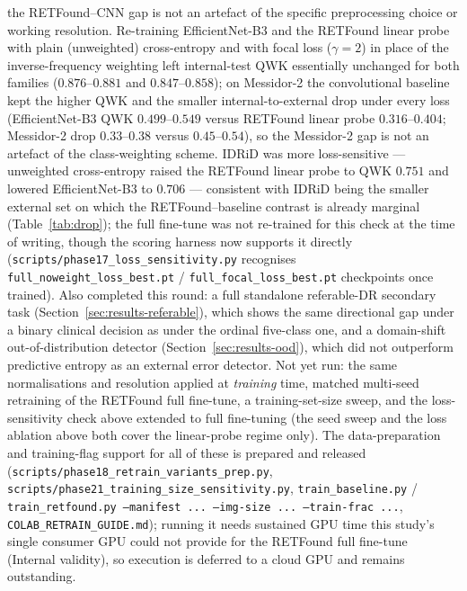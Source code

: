 \documentclass[journal]{IEEEtran}
\begin{document}
the RETFound--CNN gap is not an artefact of the specific preprocessing choice or
working resolution. Re-training EfficientNet-B3 and the RETFound linear probe
with plain (unweighted) cross-entropy and with focal loss ($\gamma=2$) in place
of the inverse-frequency weighting left internal-test QWK essentially unchanged
for both families ($0.876$--$0.881$ and $0.847$--$0.858$); on Messidor-2 the
convolutional baseline kept the higher QWK and the smaller internal-to-external
drop under every loss (EfficientNet-B3 QWK $0.499$--$0.549$ versus RETFound
linear probe $0.316$--$0.404$; Messidor-2 drop $0.33$--$0.38$ versus
$0.45$--$0.54$), so the Messidor-2 gap is not an artefact of the class-weighting
scheme. IDRiD was more loss-sensitive --- unweighted cross-entropy raised the
RETFound linear probe to QWK $0.751$ and lowered EfficientNet-B3 to $0.706$ ---
consistent with IDRiD being the smaller external set on which the
RETFound--baseline contrast is already marginal (Table~\ref{tab:drop});
the full fine-tune was not re-trained for this check at the time of writing,
though the scoring harness now supports it directly
(\texttt{scripts/phase17\_loss\_sensitivity.py} recognises
\texttt{full\_noweight\_loss\_best.pt} / \texttt{full\_focal\_loss\_best.pt}
checkpoints once trained). Also completed this round: a full standalone
referable-DR secondary task (Section~\ref{sec:results-referable}), which shows
the same directional gap under a binary clinical decision as under the ordinal
five-class one, and a domain-shift out-of-distribution detector
(Section~\ref{sec:results-ood}), which did not outperform predictive entropy as
an external error detector. Not yet run: the same normalisations and resolution
applied at \emph{training} time, matched multi-seed retraining of the RETFound
full fine-tune, a training-set-size sweep, and the loss-sensitivity check above
extended to full fine-tuning (the seed sweep and the loss ablation above both
cover the linear-probe regime only). The data-preparation and training-flag
support for all of these is prepared and released
(\texttt{scripts/phase18\_retrain\_variants\_prep.py},
\texttt{scripts/phase21\_training\_size\_sensitivity.py},
\texttt{train\_baseline.py} / \texttt{train\_retfound.py --manifest ...
--img-size ... --train-frac ...}, \texttt{COLAB\_RETRAIN\_GUIDE.md}); running it
needs sustained GPU time this study's single consumer GPU could not provide for
the RETFound full fine-tune (Internal validity), so execution is deferred to a
cloud GPU and remains outstanding.
\end{document}
